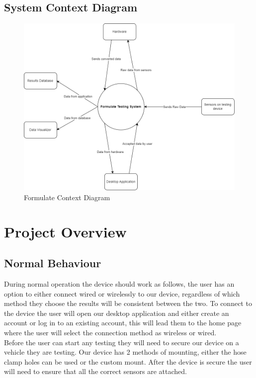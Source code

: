 \documentclass[12pt, titlepage]{article}
\begin{document}
\newpage

\subsection{System Context Diagram}
\begin{figure}[h!]
  \begin{center}
  \includegraphics[width=1.1\textwidth]{sys_context_diagram}
  \caption{Formulate Context Diagram}
  \end{center}
  \end{figure}
  \newpage

\section{Project Overview}

\subsection{Normal Behaviour}
During normal operation the device should work as follows, the user has an option to either connect wired or wirelessly to our device, regardless of which method they choose the results will be consistent between the two. To connect to the device the user will open our desktop application and either create an account or log in to an existing account, this will lead them to the home page where the user will select the connection method as wireless or wired.\\

Before the user can start any testing they will need to secure our device on a vehicle they are testing. Our device has 2 methods of mounting, either the hose clamp holes can be used or the custom mount. After the device is secure the user will need to ensure that all the correct sensors are attached.\\
\end{document}
